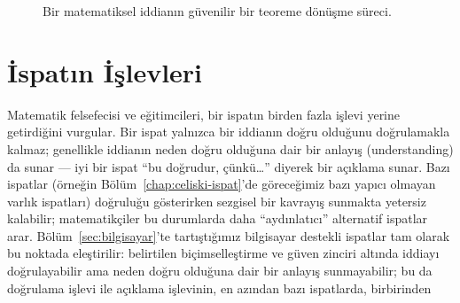 \begin{figure}[htbp]
\centering
{}
\caption{Bir matematiksel iddianın güvenilir bir teoreme dönüşme süreci.}
\end{figure}

\section{İspatın İşlevleri}

Matematik felsefecisi ve eğitimcileri, bir ispatın birden fazla işlevi yerine getirdiğini vurgular. Bir ispat yalnızca bir iddianın doğru olduğunu doğrulamakla kalmaz; genellikle iddianın neden doğru olduğuna dair bir anlayış (understanding) da sunar — iyi bir ispat “bu doğrudur, çünkü…” diyerek bir açıklama sunar. Bazı ispatlar (örneğin Bölüm~\ref{chap:celiski-ispat}’de göreceğimiz bazı yapıcı olmayan varlık ispatları) doğruluğu gösterirken sezgisel bir kavrayış sunmakta yetersiz kalabilir; matematikçiler bu durumlarda daha “aydınlatıcı” alternatif ispatlar arar. Bölüm~\ref{sec:bilgisayar}’te tartıştığımız bilgisayar destekli ispatlar tam olarak bu noktada eleştirilir: belirtilen biçimselleştirme ve güven zinciri altında iddiayı doğrulayabilir ama neden doğru olduğuna dair bir anlayış sunmayabilir; bu da doğrulama işlevi ile açıklama işlevinin, en azından bazı ispatlarda, birbirinden

